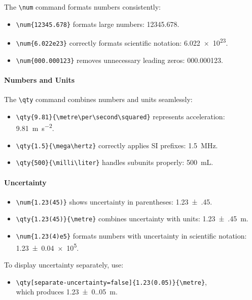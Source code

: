 The \verb|\num| command formats numbers consistently:
\begin{itemize}
    \item \verb|\num{12345.678}| formats large numbers: \num{12345.678}.
    \item \verb|\num{6.022e23}| correctly formats scientific notation: \num{6.022e23}.
    \item \verb|\num{000.000123}| removes unnecessary leading zeros: \num{000.000123}.
\end{itemize}

\paragraph*{Numbers and Units}

The \verb|\qty| command combines numbers and units seamlessly:
\begin{itemize}
    \item \verb|\qty{9.81}{\metre\per\second\squared}| represents acceleration: \qty{9.81}{\metre\per\second\squared}.
    \item \verb|\qty{1.5}{\mega\hertz}| correctly applies SI prefixes: \qty{1.5}{\mega\hertz}.
    \item \verb|\qty{500}{\milli\liter}| handles subunits properly: \qty{500}{\milli\liter}.
\end{itemize}

\paragraph*{Uncertainty}

\begin{itemize}
    \item \verb|\num{1.23(45)}| shows uncertainty in parentheses: \num{1.23(45)}.
    \item \verb|\qty{1.23(45)}{\metre}| combines uncertainty with units: \qty{1.23(45)}{\metre}.
    \item \verb|\num{1.23(4)e5}| formats numbers with uncertainty in scientific notation: \num{1.23(4)e5}.
\end{itemize}
To display uncertainty separately, use:
\begin{itemize}
    \item \verb|\qty[separate-uncertainty=false]{1.23(0.05)}{\metre}|, \\
    which produces \qty[separate-uncertainty=false]{1.23(0.05)}{\metre}.
\end{itemize}


